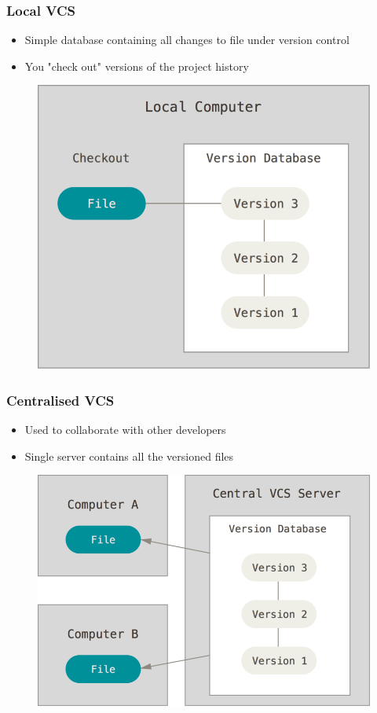 \documentclass{beamer}
\begin{document}
\begin{frame}
	\frametitle{Local VCS}
	\begin{itemize}
		\item{Simple database containing all changes to file under version control}
		\item{You "check out" versions of the project history}
	\end{itemize}
	\begin{figure}
		\includegraphics[scale=0.25]{Local_VCS-0.png}
	\end{figure}
\end{frame}

\begin{frame}
	\frametitle{Centralised VCS}
	\begin{itemize}
		\item{Used to collaborate with other developers}
		\item{Single server contains all the versioned files}
	\end{itemize}
	\begin{figure}
		\includegraphics[scale=0.25]{Centralised_VCS-0.png}
	\end{figure}
\end{frame}
\end{document}
